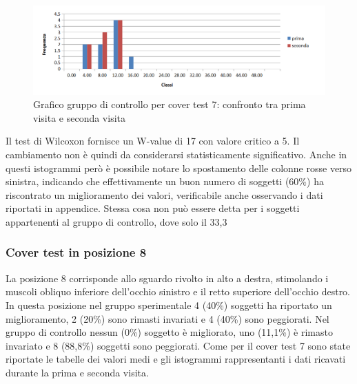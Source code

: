  \begin{figure}[h!]
	\centering
	\includegraphics[scale=0.8]{source/grafici/cover_test_7_giustissimo_non_trattati.png}
	\caption[figure]{Grafico gruppo di controllo per cover test 7: confronto tra prima visita e seconda visita}
	\label{fig:issuexample}
\end{figure}

Il test di Wilcoxon fornisce un W-value di 17 con valore critico a 5. Il cambiamento non è quindi da considerarsi statisticamente significativo. Anche in questi istogrammi però è possibile notare lo spostamento delle colonne rosse verso sinistra, indicando che effettivamente un buon numero di soggetti (60\%) ha riscontrato un miglioramento dei valori, verificabile anche osservando i dati riportati in appendice. Stessa cosa non può essere detta per i soggetti appartenenti al gruppo di controllo, dove solo il 33,3%


\subsubsection{Cover test in posizione 8}

La posizione 8 corrisponde allo sguardo rivolto in alto a destra, stimolando i muscoli obliquo inferiore dell’occhio sinistro e il retto superiore dell’occhio destro. In questa posizione nel gruppo sperimentale 4 (40\%) soggetti ha riportato un miglioramento, 2 (20\%) sono rimasti invariati e 4 (40\%) sono peggiorati. Nel gruppo di controllo nessun (0\%) soggetto è migliorato, uno (11,1\%) è rimasto invariato e 8 (88,8\%) soggetti sono peggiorati. Come per il cover test 7 sono state riportate le tabelle dei valori medi e gli istogrammi rappresentanti i dati ricavati durante la prima e seconda visita.

